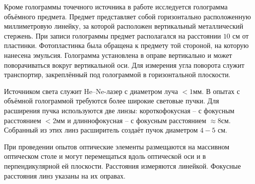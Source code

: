 Кроме голограммы точечного источника в работе исследуется голограмма объёмного предмета. 
Предмет представляет собой горизонтально расположенную миллиметровую линейку, за которой 
расположен вертикальный металлический стержень. При записи голограммы предмет располагался 
на расстоянии $10$ см от пластинки. Фотопластинка была обращена к предмету той стороной, 
на которую нанесена эмульсия. Голограмма установлена в оправе вертикально и может 
поворачиваться вокруг вертикальной оси. Для измерения угла поворота служит
транспортир, закреплённый под голограммой в горизонтальной плоскости.

Источником света служит He--Ne-лазер с диаметром луча $< 1$мм. В опытах с объёмной 
голограммой требуются более широкие световые пучки. Для расширения пучка используются две 
линзы: короткофокусная -- с фокусным расстоянием $< 2$мм и длиннофокусная -- с фокусным 
расстоянием $\approx 8$см. Собранный из этих линз расширитель создаёт пучок диаметром $4-5$ см.

При проведении опытов оптические элементы размещаются на массивном оптическом столе и могут 
перемещаться вдоль оптической оси и в перпендикулярной ей плоскости. Расстояния измеряются 
линейкой. Фокусные расстояния линз указаны на их оправах.
